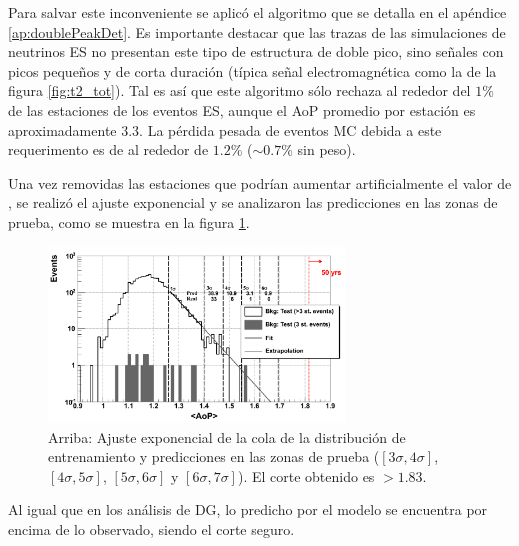	Para salvar este inconveniente se aplicó el algoritmo que se detalla en el ap\'endice \ref{ap:doublePeakDet}.
	Es importante destacar que las trazas de las simulaciones de neutrinos ES no presentan este tipo de estructura de doble pico, sino señales con picos pequeños y de corta duración (típica señal electromagnética como la de la figura \ref{fig:t2_tot}).
	Tal es así que este algoritmo sólo rechaza al rededor del $1\%$ de las estaciones de los eventos ES, aunque el AoP promedio por estación es aproximadamente 3.3.
	La pérdida pesada de eventos MC debida a este requerimento es de al rededor de $1.2\%$ ($\sim 0.7\%$ sin peso).
	
	Una vez removidas las estaciones que podrían aumentar artificialmente el valor de \aop{}, se realizó el ajuste exponencial y se analizaron las predicciones en las zonas de prueba, como se muestra en la figura \ref{fig:fitExpoES}.
	\begin{figure}[ht]
	\begin{center}
	\includegraphics[width=0.7\textwidth]{fig/seleccionAuger/fitExponential_test_with3st_forThesis}
	\caption{Arriba: Ajuste exponencial de la cola de la distribución de entrenamiento y predicciones en las zonas de prueba ($[3\sigma,4\sigma]$, $[4\sigma,5\sigma]$, $[5\sigma,6\sigma]$ y $[6\sigma,7\sigma]$). El corte obtenido es \aop{}$>1.83$.}
	\label{fig:fitExpoES}
	\end{center}
	\end{figure}
	Al igual que en los análisis de DG, lo predicho por el modelo se encuentra por encima de lo observado, siendo el corte seguro.
	
